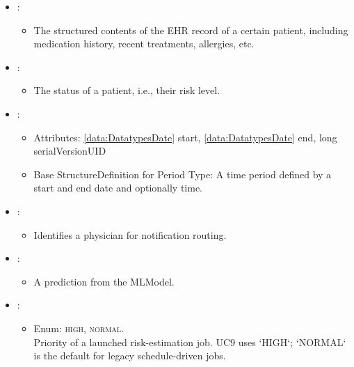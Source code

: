 \begin{itemize}[nolistsep,noitemsep]
\item {}: 
\begin{itemize}[noitemsep,nolistsep]

\item[] The structured contents of the EHR record of a certain patient, including medication history, recent treatments, allergies, etc.
\end{itemize}

\item {}: 
\begin{itemize}[noitemsep,nolistsep]

\item[] The status of a patient, i.e., their risk level.
\end{itemize}

\item {}: 
\begin{itemize}[noitemsep,nolistsep]
\item[] Attributes: \ref{data:DatatypesDate} start, \ref{data:DatatypesDate} end, long serialVersionUID
\item[] Base StructureDefinition for Period Type: A time period defined by a start and end date and optionally time.
\end{itemize}

\item {}: 
\begin{itemize}[noitemsep,nolistsep]

\item[] Identifies a physician for notification routing.
\end{itemize}

\item {}: 
\begin{itemize}[noitemsep,nolistsep]

\item[] A prediction from the MLModel.
\end{itemize}

\item {}: 
\begin{itemize}[noitemsep,nolistsep]

\item[] Enum: \textsc{high}, \textsc{normal}.\\Priority of a launched risk-estimation job. UC9 uses `HIGH`; `NORMAL` is the default for legacy schedule-driven jobs.
\end{itemize}


\end{itemize}
